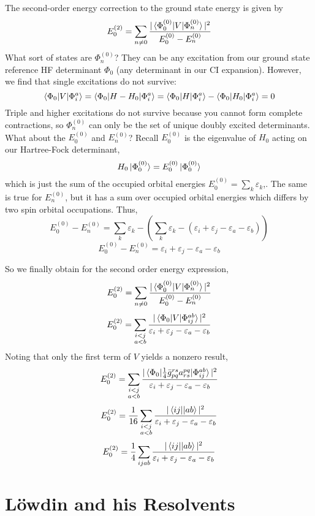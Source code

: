 \documentclass{article}
\newcommand{\eps}{\varepsilon}
\newcommand{\Ezero}{E^{(0)}}
\newcommand{\Phizero}{\Phi^{(0)}}
\begin{document}
The second-order energy correction to the ground state energy is given by 
\[ E_0^{(2)} = \sum_{n \neq 0} \frac{ |\braket{ \Phizero_0 | V | \Phizero_n} |^2  }{ \Ezero_0 - \Ezero_n}  \]
What sort of states are $\Phizero_n$? They can be any excitation from our ground state reference HF determinant $\Phi_0$ (any determinant in our CI expansion).
However, we find that single excitations do not survive:
\[ \braket{\Phi_0 | V | \Phi_i^a } =  \braket{\Phi_0 | H - H_0 | \Phi_i^a } = \braket{\Phi_0 | H | \Phi_i^a } - \braket{\Phi_0 | H_0 | \Phi_i^a }  = 0 \]
Triple and higher excitations do not survive because you cannot form complete contractions, so $\Phizero_n$ can only be the set of unique doubly excited determinants. 
What about the $\Ezero_0$ and $\Ezero_n $?
Recall $\Ezero_0$ is the eigenvalue of $H_0$ acting on our Hartree-Fock determinant,
\[H_0 \ket{\Phi_0^{(0)}} = E_0^{(0)} \ket{\Phi_0^{(0)}} \]
 which is just the sum of the occupied orbital energies $E_0^{(0)} = \sum_k \eps_k$,.
The same is true for $\Ezero_n$, but it has a sum over occupied orbital energies which differs by two spin orbital occupations. Thus,
\[\Ezero_0 - \Ezero_n =  \sum_k \eps_k - ( \sum_k \eps_k - (\eps_i + \eps_j - \eps_a - \eps_b)) \]
\[\Ezero_0 - \Ezero_n =  \eps_i + \eps_j - \eps_a - \eps_b \]

So we finally obtain for the second order energy expression,
\[ E_0^{(2)} = \sum_{n \neq 0} \frac{ |\braket{ \Phizero_0 | V | \Phizero_n} |^2  }{ \Ezero_0 - \Ezero_n}  \]
\[ E_0^{(2)} = \sum_{\substack{i < j \\ a < b}} \frac{ |\braket{ \Phi_0 | V | \Phi_{ij}^{ab}} |^2}{ \eps_i + \eps_j - \eps_a - \eps_b  }  \]
Noting that only the first term of $V$ yields a nonzero result,
\[ E_0^{(2)} = \sum_{\substack{i < j \\ a < b}} \frac{ |\braket{ \Phi_0 | \frac{1}{4} \bar{g}_{pq}^{rs} a_{rs}^{pq} | \Phi_{ij}^{ab}} |^2}{ \eps_i + \eps_j - \eps_a - \eps_b  }  \]
\[ E_0^{(2)} = \frac{1}{16} \sum_{\substack{i < j \\ a < b}}  \frac{ |\braket{ ij || ab}|^2}{ \eps_i + \eps_j - \eps_a - \eps_b}\]
\[ E_0^{(2)} = \frac{1}{4} \sum_{ijab} \frac{ |\braket{ ij || ab}|^2}{ \eps_i + \eps_j - \eps_a - \eps_b}\]



\section{L{\"o}wdin and his Resolvents}
 
\end{document}
